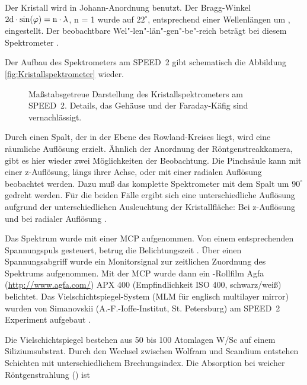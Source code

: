 Der Kristall wird in Johann-Anordnung \cite{johann:31} benutzt.
Der Bragg-Winkel $2{\rm d} \cdot \sin(\varphi) = {\rm n} \cdot
\lambda$, n = 1 wurde auf $22^\circ$, entsprechend einer
Wellenlängen um , eingestellt. Der
beobachtbare Wel"-len"-län"-gen"-be"-reich beträgt bei diesem
Spektrometer .
\par
Der Aufbau des Spektrometers am SPEED~2 gibt schematisch die Abbildung
\vref{fig:Kristallspektrometer} wieder.
%
\par
\begin{figure}[H]
  \center
  \caption{Maßstabsgetreue Darstellung des Kristallspektrometers am SPEED~2.
     Details, das Gehäuse und der Faraday-Käfig sind vernachlässigt.}
  \label{fig:Kristallspektrometer}
\end{figure}
%
\par
Durch einen  Spalt, der in der Ebene des Rowland-Kreises
liegt, wird eine räumliche Auflösung erzielt. Ähnlich der Anordnung der
Röntgenstreakkamera, gibt es hier wieder zwei Möglichkeiten der
Beobachtung. Die Pinchsäule kann mit einer z-Auflösung, längs ihrer
Achse, oder mit einer radialen Auflösung beobachtet werden. Dazu muß
das komplette Spektrometer mit dem Spalt um $90^\circ$ gedreht werden.
Für die beiden Fälle ergibt sich eine unterschiedliche Auflösung
aufgrund der unterschiedlichen Ausleuchtung der Kristallfläche: Bei
z-Auflösung  und bei radialer
Auflösung .
\par
Das Spektrum wurde mit einer MCP aufgenommen. Von einem entsprechenden
Spannungspuls gesteuert, betrug die Belichtungszeit . Über
einen Spannungsabgriff wurde ein Monitorsignal zur zeitlichen Zuordnung
des Spektrums aufgenommen. Mit der MCP wurde dann ein
-Rollfilm Agfa (\url{http://www.agfa.com/}) APX 400
(Empfindlichkeit ISO 400, schwarz/weiß) belichtet.
%
\label{sec:mlm}
%
Das Vielschichtspiegel-System (MLM für englisch multilayer mirror)
wurden von Simanovskii (A.-F.-Ioffe-Institut, St. Petersburg) am
SPEED~2 Experiment aufgebaut \cite{bobashev:97}.
\par
Die Vielschichtspiegel bestehen aus 50 bis 100 Atomlagen W/Sc auf
einem   
Siliziumsubstrat. Durch den Wechsel zwischen Wolfram und Scandium
entstehen Schichten mit unterschiedlichem Brechungsindex. Die
Absorption bei weicher Röntgenstrahlung () ist

